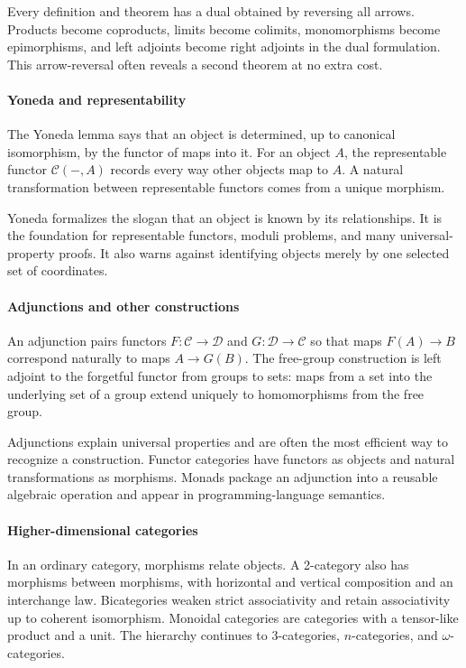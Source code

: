 Every definition and theorem has a dual obtained by reversing all arrows. Products become coproducts, limits become colimits, monomorphisms become epimorphisms, and left adjoints become right adjoints in the dual formulation. This arrow-reversal often reveals a second theorem at no extra cost.

\paragraph{Yoneda and representability}

The Yoneda lemma says that an object is determined, up to canonical isomorphism, by the functor of maps into it. For an object $A$, the representable functor $\mathcal C(-,A)$ records every way other objects map to $A$. A natural transformation between representable functors comes from a unique morphism.

Yoneda formalizes the slogan that an object is known by its relationships. It is the foundation for representable functors, moduli problems, and many universal-property proofs. It also warns against identifying objects merely by one selected set of coordinates.

\paragraph{Adjunctions and other constructions}

An adjunction pairs functors $F:\mathcal C\to\mathcal D$ and $G:\mathcal D\to\mathcal C$ so that maps $F(A)\to B$ correspond naturally to maps $A\to G(B)$. The free-group construction is left adjoint to the forgetful functor from groups to sets: maps from a set into the underlying set of a group extend uniquely to homomorphisms from the free group.

Adjunctions explain universal properties and are often the most efficient way to recognize a construction. Functor categories have functors as objects and natural transformations as morphisms. Monads package an adjunction into a reusable algebraic operation and appear in programming-language semantics.

\paragraph{Higher-dimensional categories}

In an ordinary category, morphisms relate objects. A 2-category also has morphisms between morphisms, with horizontal and vertical composition and an interchange law. Bicategories weaken strict associativity and retain associativity up to coherent isomorphism. Monoidal categories are categories with a tensor-like product and a unit. The hierarchy continues to 3-categories, $n$-categories, and $\omega$-categories.

